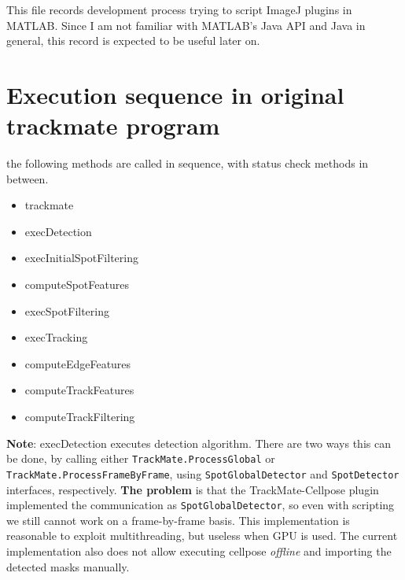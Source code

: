 \documentclass[11pt]{article}
\author{Yantao Xia}
\date{\textit{<2022-05-17 Tue>}}
\title{}
\begin{document}
This file records development process trying to script ImageJ plugins in MATLAB. Since I am not familiar with MATLAB's Java API and Java in general, this record is expected to be useful later on. 

\section{Execution sequence in original trackmate program}
\label{sec:orgcc400b6}
the following methods are called in sequence, with status check methods in between.
\begin{itemize}
\item trackmate
\item execDetection
\item execInitialSpotFiltering
\item computeSpotFeatures
\item execSpotFiltering
\item execTracking
\item computeEdgeFeatures
\item computeTrackFeatures
\item computeTrackFiltering
\end{itemize}

\textbf{Note}: execDetection executes detection algorithm. There are two ways this can be done, by calling either \texttt{TrackMate.ProcessGlobal} or  \texttt{TrackMate.ProcessFrameByFrame}, using \texttt{SpotGlobalDetector} and \texttt{SpotDetector} interfaces, respectively. 
\textbf{The problem} is that the TrackMate-Cellpose plugin implemented the communication as \texttt{SpotGlobalDetector}, so even with scripting we still cannot work on a frame-by-frame basis. This implementation is reasonable to exploit multithreading, but useless when GPU is used.
The current implementation also does not allow executing cellpose \emph{offline} and importing the detected masks manually.
\end{document}
